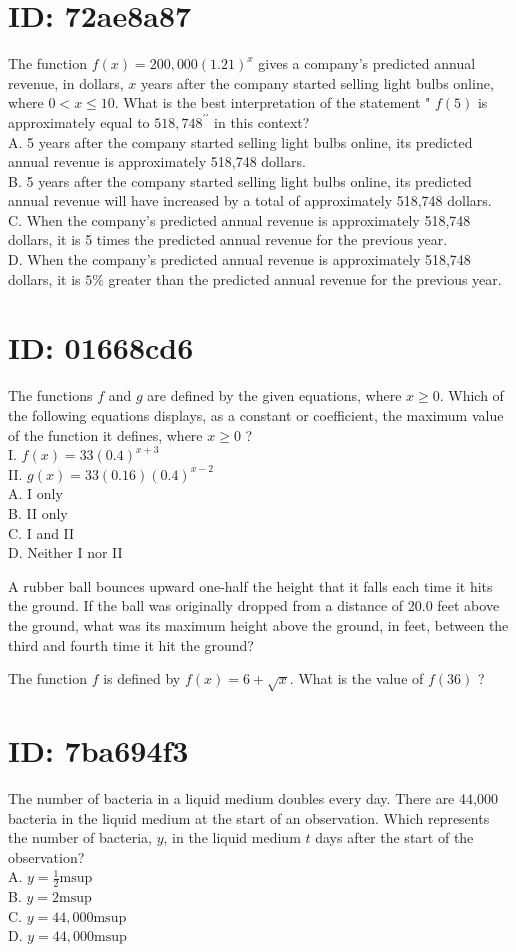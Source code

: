 \section*{ID: 72ae8a87}
The function $f(x)=200,000(1.21)^{x}$ gives a company's predicted annual revenue, in dollars, $x$ years after the company started selling light bulbs online, where $0<x \leq 10$. What is the best interpretation of the statement " $f(5)$ is approximately equal to $518,748^{\prime \prime}$ in this context?\\
A. 5 years after the company started selling light bulbs online, its predicted annual revenue is approximately 518,748 dollars.\\
B. 5 years after the company started selling light bulbs online, its predicted annual revenue will have increased by a total of approximately 518,748 dollars.\\
C. When the company's predicted annual revenue is approximately 518,748 dollars, it is 5 times the predicted annual revenue for the previous year.\\
D. When the company's predicted annual revenue is approximately 518,748 dollars, it is $5 \%$ greater than the predicted annual revenue for the previous year.

\section*{ID: 01668cd6}
The functions $f$ and $g$ are defined by the given equations, where $x \geq 0$. Which of the following equations displays, as a constant or coefficient, the maximum value of the function it defines, where $x \geq 0$ ?\\
I. $f(x)=33(0.4)^{x+3}$\\
II. $g(x)=33(0.16)(0.4)^{x-2}$\\
A. I only\\
B. II only\\
C. I and II\\
D. Neither I nor II

A rubber ball bounces upward one-half the height that it falls each time it hits the ground. If the ball was originally dropped from a distance of 20.0 feet above the ground, what was its maximum height above the ground, in feet, between the third and fourth time it hit the ground?

The function $f$ is defined by $f(x)=6+\sqrt{x}$. What is the value of $f(36)$ ?

\section*{ID: 7ba694f3}
The number of bacteria in a liquid medium doubles every day. There are 44,000 bacteria in the liquid medium at the start of an observation. Which represents the number of bacteria, $y$, in the liquid medium $t$ days after the start of the observation?\\
A. $y=\frac{1}{2} \mathrm{msup}$\\
B. $y=2 \mathrm{msup}$\\
C. $y=44,000 \mathrm{msup}$\\
D. $y=44,000 \mathrm{msup}$

